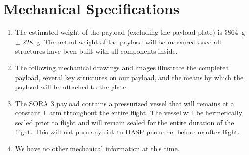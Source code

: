 \newpage
\section{Mechanical Specifications}
\label{sec:Mechanical}

\hspace*{0.5cm}
\begin{minipage}{\linewidth-0.5cm}
  \begin{enumerate}[label=\Alph*.]
  \item The estimated weight of the payload (excluding the payload plate) is \SI{5864}{\gram} $\pm$ \SI{228}{\gram}. The actual weight of the payload will be measured once all structures have been built with all components inside.
  \item The following mechanical drawings and images illustrate the completed payload, several key structures on our payload, and the means by which the payload will be attached to the plate.
  \item The SORA 3 payload contains a pressurized vessel that will remains at a constant \SI{1}{atm} throughout the entire flight. The vessel will be hermetically sealed prior to flight and will remain sealed for the entire duration of the flight. This will not pose any risk to HASP personnel before or after flight.
  \item We have no other mechanical information at this time.
  \end{enumerate}
\end{minipage}

\hspace{1cm}

